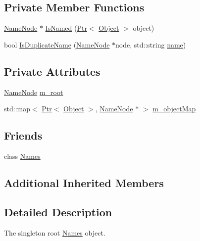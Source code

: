 \subsection*{Private Member Functions}
\begin{DoxyCompactItemize}
\item 
\hyperlink{classns3_1_1NameNode}{Name\+Node} $\ast$ \hyperlink{classns3_1_1NamesPriv_a9867bf67ff8f138d1dd4d175e1fb0fde}{Is\+Named} (\hyperlink{classns3_1_1Ptr}{Ptr}$<$ \hyperlink{classns3_1_1Object}{Object} $>$ object)
\item 
bool \hyperlink{classns3_1_1NamesPriv_a2596edf33333e7745eb47a620783c004}{Is\+Duplicate\+Name} (\hyperlink{classns3_1_1NameNode}{Name\+Node} $\ast$node, std\+::string \hyperlink{generate__test__data__lte__spectrum__model_8m_ab74e6bf80237ddc4109968cedc58c151}{name})
\end{DoxyCompactItemize}
\subsection*{Private Attributes}
\begin{DoxyCompactItemize}
\item 
\hyperlink{classns3_1_1NameNode}{Name\+Node} \hyperlink{classns3_1_1NamesPriv_a24851b2ca8230416228472b2e4e1b587}{m\+\_\+root}
\item 
std\+::map$<$ \hyperlink{classns3_1_1Ptr}{Ptr}$<$ \hyperlink{classns3_1_1Object}{Object} $>$, \hyperlink{classns3_1_1NameNode}{Name\+Node} $\ast$ $>$ \hyperlink{classns3_1_1NamesPriv_a19b615be3c0c142fe0ec7539db8598cf}{m\+\_\+object\+Map}
\end{DoxyCompactItemize}
\subsection*{Friends}
\begin{DoxyCompactItemize}
\item 
class \hyperlink{classns3_1_1NamesPriv_a8e6dace6fb74ee2b530528e4ecd0f22c}{Names}
\end{DoxyCompactItemize}
\subsection*{Additional Inherited Members}


\subsection{Detailed Description}
The singleton root \hyperlink{classns3_1_1Names}{Names} object. 

